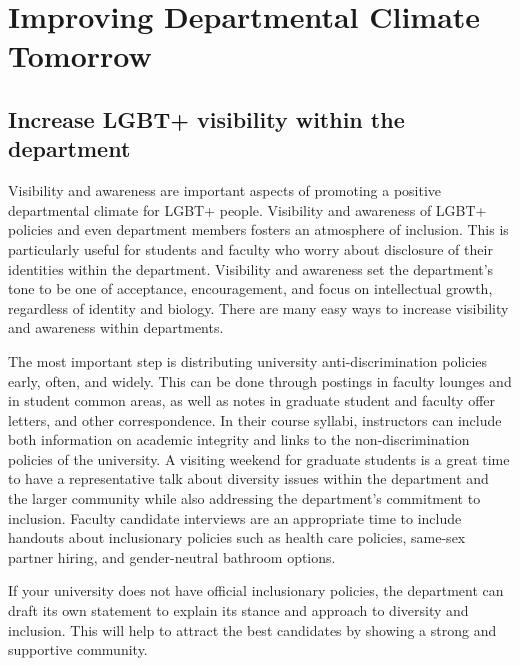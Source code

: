 %

\chapter{Improving Departmental Climate Tomorrow}	%
\label{climate-tomorrow}		%
\normalsize			%


\section {Increase LGBT+ visibility within the department}
\label{visibility}
Visibility and awareness are important aspects of promoting a positive departmental climate for LGBT+ people. Visibility and awareness of LGBT+ policies and even department members fosters an atmosphere of inclusion. This is particularly useful for students and faculty who worry about disclosure of their identities within the department. Visibility and awareness set the department's tone to be one of acceptance, encouragement, and focus on intellectual growth, regardless of identity and biology. There are many easy ways to increase visibility and awareness within departments.

The most important step is distributing university anti-discrimination policies early, often, and widely. This can be done through postings in faculty lounges and in student common areas, as well as notes in graduate student and faculty offer letters, and other correspondence. In their course syllabi, instructors can include both information on academic integrity and links to the non-discrimination policies of the university. A visiting weekend for graduate students is a great time to have a representative talk about diversity issues within the department and the larger community while also addressing the department's commitment to inclusion. Faculty candidate interviews are an appropriate time to include handouts about inclusionary policies such as health care policies, same-sex partner hiring, and gender-neutral bathroom options.

If your university does not have official inclusionary policies, the department can draft its own statement to explain its stance and approach to diversity and inclusion. This will help to attract the best candidates by showing a strong and supportive community.


